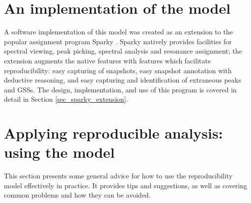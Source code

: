 \section{An implementation of the model}
A software implementation of this model was created as an extension to the
popular assignment program Sparky \cite{sparky}.  Sparky natively provides
facilities for spectral viewing, peak picking, spectral analysis and 
resonance assignment; the extension augments the native features with 
features which facilitate reproducibility: easy capturing of snapshots,
easy snapshot annotation with deductive reasoning, and easy capturing and
identification of extraneous peaks and GSSs.
The design, implementation, and use of this program is covered in 
detail in Section \ref{sec_sparky_extension}.



\section{Applying reproducible analysis: using the model}
This section presents some general advice for how to use the reproducibility
model effectively in practice.  It provides tips and suggestions, as well
as covering common problems and how they can be avoided.

